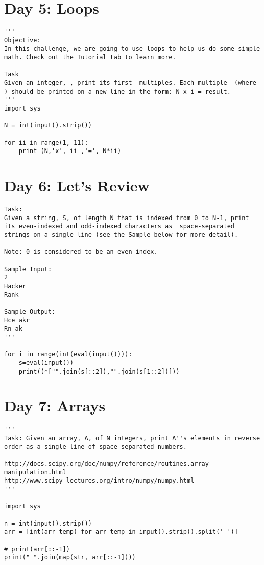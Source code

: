 \documentclass[11pt,a4paper]{article}
\begin{document}
\newpage
\section{Day 5: Loops}
\begin{lstlisting}
'''
Objective: 
In this challenge, we are going to use loops to help us do some simple math. Check out the Tutorial tab to learn more.

Task 
Given an integer, , print its first  multiples. Each multiple  (where ) should be printed on a new line in the form: N x i = result.
'''
import sys

N = int(input().strip())

for ii in range(1, 11):
    print (N,'x', ii ,'=', N*ii)

\end{lstlisting}


\newpage
\section{Day 6: Let's Review}
\begin{lstlisting}
Task:
Given a string, S, of length N that is indexed from 0 to N-1, print its even-indexed and odd-indexed characters as  space-separated strings on a single line (see the Sample below for more detail).

Note: 0 is considered to be an even index.

Sample Input:
2
Hacker
Rank

Sample Output:
Hce akr
Rn ak
'''

for i in range(int(eval(input()))):
    s=eval(input())
    print((*["".join(s[::2]),"".join(s[1::2])]))

\end{lstlisting}


\newpage
\section{Day 7: Arrays}
\begin{lstlisting}
'''
Task: Given an array, A, of N integers, print A''s elements in reverse order as a single line of space-separated numbers. 

http://docs.scipy.org/doc/numpy/reference/routines.array-manipulation.html
http://www.scipy-lectures.org/intro/numpy/numpy.html
'''

import sys

n = int(input().strip())
arr = [int(arr_temp) for arr_temp in input().strip().split(' ')]

# print(arr[::-1])
print(" ".join(map(str, arr[::-1])))

\end{lstlisting}
\end{document}
